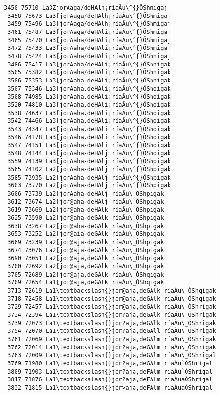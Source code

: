 \documentclass[11pt]{article}
\begin{document}
\begin{Verbatim}[commandchars=\\\{\}]
 3450 75710 La3ZjorAaga/deHAlh¡ríaÂu\^{}ÕShmigaj
 3458 75673 La3[jorAaga/deHAlh¡ríaÂu\^{}ÕShmigaj
 3459 75496 La3[jorAaga/deHAlh¡ríaÂu\^{}ÕShmigaj
 3461 75487 La3[jorAaga/deHAli¡ríaÂu\^{}ÕShmigaj
 3465 75470 La3[jorAaha/deHAli¡ríaÂu\^{}ÕShmigaj
 3472 75433 La3[jorAaha/deHAli¡ríaÂu\^{}ÕShmigaj
 3478 75424 La3[jorAaha/deHAli¡ríaÂu\^{}ÕShnigaj
 3486 75417 La3[jorAaha/deHAli¡ríaÂu\^{}ÕShnigak
 3505 75382 La3[jorAaha/deHAli¡ríaÂu\^{}ÕShnigak
 3506 75353 La3[jorAaha.deHAli¡ríaÂu\^{}ÕShnigak
 3507 75346 La3[jorAaha.deHAli¡ríaÂu\^{}ÕShoigak
 3508 74985 La3[jorAaha.deHAli¡ríaÂu\^{}ÔShoigak
 3520 74810 La3[jorAaha.deHAli¡ríaÂu\^{}ÔShoigak
 3538 74637 La3[jorAaha.deHAli¡ríaÂu\^{}ÔShoigak
 3542 74466 La3[jorAaha.deHAli¡ríaÂu\^{}ÔShoigak
 3543 74347 La3[jorAaha.deHAli ríaÂu\^{}ÔShoigak
 3546 74178 La3[jorAaha.deHAli ríaÂu\^{}ÔShoigak
 3547 74151 La3[jorAaha-deHAli ríaÂu\^{}ÔShoigak
 3548 74144 La3[jorAaha-deHAlj ríaÂu\^{}ÔShoigak
 3559 74139 La3[jorAaha-deHAlj ríaÂu\^{}ÔShpigak
 3565 74102 La2[jorAaha-deHAlj ríaÂu\^{}ÔShpigak
 3585 73935 La2[jorAaha-deHAlj ríaÂu\^{}ÔShpigak
 3603 73770 La2[jorAaha-deHAlj ríaÂu\^{}ÔShpigak
 3606 73739 La2[jorAaha-deHAlj ríaÂu\_ÔShpigak
 3612 73674 La2[jor@aha-deHAlj ríaÂu\_ÔShpigak
 3619 73669 La2[jor@aha-deHAlk ríaÂu\_ÔShpigak
 3625 73590 La2[jor@aha-deGAlk ríaÂu\_ÔShpigak
 3638 73267 La2[jor@aha-deGAlk ríaÁu\_ÔShpigak
 3653 73252 La2[jor@aia-deGAlk ríaÁu\_ÔShpigak
 3669 73239 La2[jor@aja-deGAlk ríaÁu\_ÔShpigak
 3674 73076 La2[jor@aja-deGAlk ríaÁu\_ÔShpigak
 3690 73051 La2[jor@aja,deGAlk ríaÁu\_ÔShpigak
 3700 72692 La2[jor@aja,deGAlk ríaÁu\_ÓShpigak
 3705 72689 La2[jor@aja,deGAlk ríaÁu\_ÓShqigak
 3709 72654 La1[jor@aja,deGAlk ríaÁu\_ÓShqigak
 3713 72619 La1\textbackslash{}jor@aja,deGAlk ríaÁu\_ÓShqigak
 3718 72458 La1\textbackslash{}jor@aja,deGAlk ríaÁu\_ÓShqigak
 3729 72457 La1\textbackslash{}jor@aja,deGAlk ríaÁu\_ÓShrigak
 3734 72394 La1\textbackslash{}jor?aja,deGAlk ríaÁu\_ÓShrigak
 3739 72073 La1\textbackslash{}jor?aja,deGAlk ríaÀu\_ÓShrigak
 3754 72070 La1\textbackslash{}jor?aja,deGAll ríaÀu\_ÓShrigak
 3761 72069 La1\textbackslash{}jor?aja,deGAlm ríaÀu\_ÓShrigak
 3762 72014 La1\textbackslash{}jor?aja,deGAlm ríaÀu\_ÓShrigak
 3763 72009 La1\textbackslash{}jor?aja,deGAlm ríaÀu\_ÓShrigal
 3769 71980 La1\textbackslash{}jor?aja,deGAlm ríaÀu`ÓShrigal
 3809 71903 La1\textbackslash{}jor?aja,deFAlm ríaÀu`ÓShrigal
 3817 71876 La1\textbackslash{}jor?aja,deFAlm ríaÀuaÓShrigal
 3832 71815 La1\textbackslash{}jor>aja,deFAlm ríaÀuaÓShrigal

\end{Verbatim}
\end{document}
